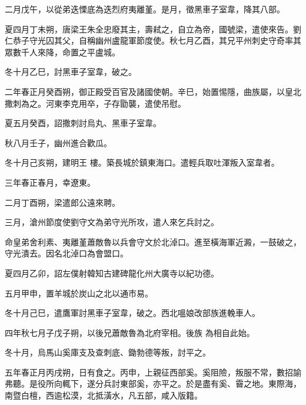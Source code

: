 \begin{pinyinscope}
 二月戊午，以從弟迭慄底為迭烈府夷離堇。是月，徵黑車子室韋，降其八部。



 夏四月丁未朔，唐梁王朱全忠廢其主，壽弒之，自立為帝，國號梁，遣使來告。劉仁恭子守光囚其父，自稱幽州盧龍軍節度使。秋七月乙酉，其兄平州刺史守奇率其眾數千人來降，命置之平盧城。



 冬十月乙巳，討黑車子室韋，破之。



 二年春正月癸酉朔，御正殿受百官及諸國使朝。辛巳，始置惕隱，曲族屬，以皇北撒刺為之。河東李克用卒，子存勖襲，遣使吊慰。



 夏五月癸酉，詔撒刺討烏丸、黑車子室韋。



 秋八月壬子，幽州進合歡瓜。



 冬十月己亥朔，建明王
 樓。築長城於鎮東海口。遣輕兵取吐渾叛入室韋者。



 三年春正春月，幸遼東。



 二月丁酉朔，梁遣郎公遠來聘。



 三月，滄州節度使劉守文為弟守光所攻，遣人來乞兵討之。



 命皇弟舍利素、夷離堇蕭敵魯以兵會守文於北淖口。進至橫海軍近澱，一鼓破之，守光潰去。因名北淖口為會盟口。



 夏四月乙卯，詔左僕射韓知古建碑龍化州大廣寺以紀功德。



 五月甲申，置羊城於炭山之北以通市易。



 冬十月己巳，遣鷹軍討黑車子室韋，破之。西北嗢娘改部族進輓車人。



 四年秋七月子戊子朔，以後兄蕭敵魯為北府宰相。後族
 為相自此始。



 冬十月，烏馬山奚庫支及查刺底、鋤勃德等叛，討平之。



 五年春正月丙戌朔，日有食之。丙申，上親征西部奚。奚阻險，叛服不常，數招諭弗聽。是役所向輒下，遂分兵討東部奚，亦平之。於是盡有奚、霫之地。東際海，南暨白檀，西逾松漠，北抵潢水，凡五部，咸入版籍。




\end{pinyinscope}
